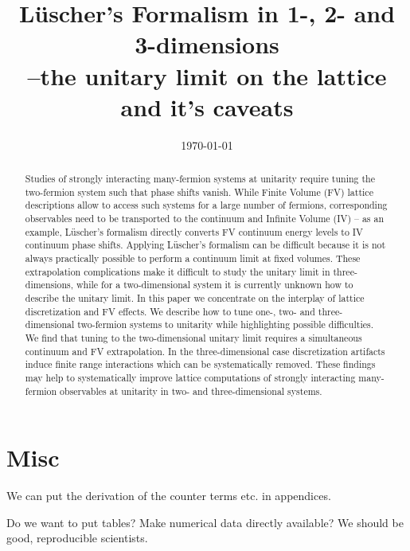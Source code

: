 \documentclass[aps,superscriptaddress,tightenlines,nofootinbib,floatfix,longbibliography,notitlepage]{revtex4-1}
\begin{document}
\title{L\"{u}scher's Formalism in 1-, 2- and 3-dimensions\\--the unitary limit on the lattice and it's caveats}





\date{\today}

\begin{abstract}
Studies of strongly interacting many-fermion systems at unitarity require tuning the two-fermion system such that phase shifts vanish.
While Finite Volume (FV) lattice descriptions allow to access such systems for a large number of fermions, corresponding observables need to be transported to the continuum and Infinite Volume (IV) -- as an example, L\"{u}scher's formalism directly converts FV continuum energy levels to IV continuum phase shifts.
Applying L\"{u}scher's formalism can be difficult because it is not always practically possible to perform a continuum limit at fixed volumes.
These extrapolation complications make it difficult to study the unitary limit in three-dimensions, while for a two-dimensional system it is currently unknown how to describe the unitary limit.
In this paper we concentrate on the interplay of lattice discretization and FV effects.
We describe how to tune one-, two- and three-dimensional two-fermion systems to unitarity while highlighting possible difficulties.
We find that tuning to the two-dimensional unitary limit requires a simultaneous continuum and FV extrapolation.
In the three-dimensional case discretization artifacts induce finite range interactions which can be systematically removed.
These findings may help to systematically improve lattice computations of strongly interacting many-fermion observables at unitarity in two- and three-dimensional systems.
\end{abstract}

\maketitle











\appendix
\section{Misc}

We can put the derivation of the counter terms etc. in appendices.

Do we want to put tables?  Make numerical data directly available?  We should be good, reproducible scientists.









\end{document}
